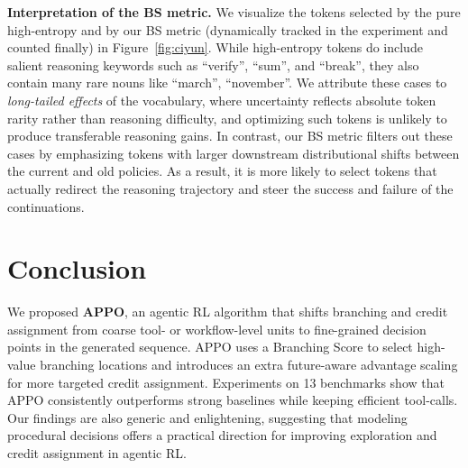 \documentclass{article}
\begin{document}
\noindent\textbf{Interpretation of the BS metric.} We visualize the tokens selected by the pure high-entropy and by our BS metric (dynamically tracked in the experiment and counted finally) in Figure~\ref{fig:ciyun}. While high-entropy tokens do include salient reasoning keywords such as ``verify'', ``sum'', and ``break'', they also contain many rare nouns like ``march'', ``november''. We attribute these cases to \textit{long-tailed effects} of the vocabulary, where uncertainty reflects absolute token rarity rather than reasoning difficulty, and optimizing such tokens is unlikely to produce transferable reasoning gains. In contrast, our BS metric filters out these cases by emphasizing tokens with larger downstream distributional shifts between the current and old policies. As a result, it is more likely to select tokens that actually redirect the reasoning trajectory and steer  the success and failure of the continuations.
 
\vspace{-0.1cm}
\section{Conclusion}

We proposed \textbf{APPO}, an agentic RL algorithm that shifts branching and credit assignment from coarse tool- or workflow-level units to fine-grained decision points in the generated sequence. APPO uses a Branching Score to select high-value branching locations and introduces an extra future-aware advantage scaling for more targeted credit assignment. Experiments on 13 benchmarks show that APPO consistently outperforms strong baselines while keeping efficient tool-calls. Our findings are also generic and enlightening, suggesting that modeling procedural decisions offers a practical direction for improving exploration and credit assignment in agentic RL.

{
    \small
    
    
}
 


\clearpage
\newpage 
\appendix
\end{document}
